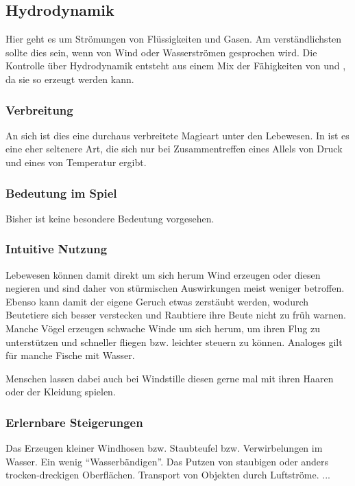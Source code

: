 \subsection{Hydrodynamik}\label{magie:hydrodynamik}
Hier geht es  um Strömungen von Flüssigkeiten und Gasen.
Am verständlichsten sollte dies sein, wenn von Wind oder Wasserströmen gesprochen wird.
Die Kontrolle über Hydrodynamik entsteht aus einem Mix der Fähigkeiten von  und , da sie so erzeugt werden kann.

\subsubsection{Verbreitung}
An sich ist dies eine durchaus verbreitete Magieart unter den Lebewesen.
In  ist es eine eher seltenere Art, die sich nur bei Zusammentreffen eines Allels von Druck und eines von Temperatur ergibt.

\subsubsection{Bedeutung im Spiel}
Bisher ist keine besondere Bedeutung vorgesehen.

\subsubsection{Intuitive Nutzung}
Lebewesen können damit direkt um sich herum Wind erzeugen oder diesen negieren und sind daher von stürmischen Auswirkungen meist weniger betroffen.
Ebenso kann damit der eigene Geruch etwas zerstäubt werden, wodurch Beutetiere sich besser verstecken und Raubtiere ihre Beute nicht zu früh warnen.
Manche Vögel erzeugen schwache Winde um sich herum, um ihren Flug zu unterstützen und schneller fliegen bzw. leichter steuern zu können. 
Analoges gilt für manche Fische mit Wasser.

Menschen lassen dabei auch bei Windstille diesen gerne mal mit ihren Haaren oder der Kleidung spielen.

\subsubsection{Erlernbare Steigerungen}
\begin{outline}
	\1 Das Erzeugen kleiner Windhosen bzw. Staubteufel bzw. Verwirbelungen im Wasser.
	\1 Ein wenig "`Wasserbändigen"'.
	\1 Das Putzen von staubigen oder anders trocken-dreckigen Oberflächen.
	\1 Transport von Objekten durch Luftströme.
	\1 ...
\end{outline}

